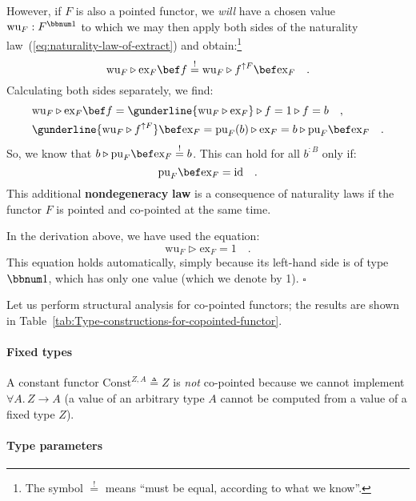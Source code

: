 However, if $F$ is also a pointed functor, we \emph{will} have a
chosen value $\text{wu}_{F}:F^{\bbnum 1}$ to which we may then apply
both sides of the naturality law~(\ref{eq:naturality-law-of-extract})
and obtain:\footnote{The symbol $\overset{!}{=}$ means \textsf{``}must be equal, according to
what we know\textsf{''}.}
\[
\text{wu}_{F}\triangleright\text{ex}_{F}\bef f\overset{!}{=}\text{wu}_{F}\triangleright f^{\uparrow F}\bef\text{ex}_{F}\quad.
\]
Calculating both sides separately, we find:
\begin{align*}
 & \text{wu}_{F}\triangleright\text{ex}_{F}\bef f=\gunderline{\text{wu}_{F}\triangleright\text{ex}_{F}}\triangleright f=1\triangleright f=b\quad,\\
 & \gunderline{\text{wu}_{F}\triangleright f^{\uparrow F}}\bef\text{ex}_{F}=\text{pu}_{F}(b)\triangleright\text{ex}_{F}=b\triangleright\text{pu}_{F}\bef\text{ex}_{F}\quad.
\end{align*}
So, we know that $b\triangleright\text{pu}_{F}\bef\text{ex}_{F}\overset{!}{=}b$.
This can hold for all $b^{:B}$ only if:
\[
\text{pu}_{F}\bef\text{ex}_{F}=\text{id}\quad.
\]
This additional \textbf{nondegeneracy} \textbf{law}
is a consequence of naturality laws if the functor $F$ is pointed
and co-pointed at the same time.

In the derivation above, we have used the equation:
\begin{equation}
\text{wu}_{F}\triangleright\text{ex}_{F}=1\quad.\label{eq:co-pointed-nondegeneracy-law-wu}
\end{equation}
 This equation holds automatically, simply because its left-hand side
is of type $\bbnum 1$, which has only one value (which we denote
by 1). $\square$

Let us perform structural analysis for co-pointed functors; the results
are shown in Table~\ref{tab:Type-constructions-for-copointed-functor}.

\paragraph{Fixed types}

A constant functor $\text{Const}^{Z,A}\triangleq Z$ is \emph{not}
co-pointed because we cannot implement $\forall A.\,Z\rightarrow A$
(a value of an arbitrary type $A$ cannot be computed from a value
of a fixed type $Z$).

\paragraph{Type parameters}

